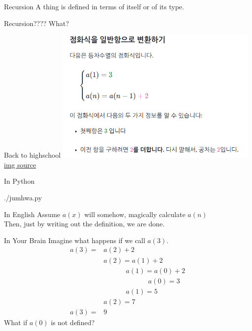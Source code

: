 \documentclass{beamer}
\begin{document}
\begin{frame}{Recursion}
  A thing is defined in terms of itself or of its type.
\end{frame}

\begin{frame}{Recursion????}
  What?
\end{frame}

\begin{frame}{Back to highschool}
  \includegraphics[width=100mm]{./jumhwasik.png}\\
  \href{https://ko.khanacademy.org/math/algebra/sequences/constructing-arithmetic-sequences/a/converting-recursive-and-explicit-formulas-of-arithmetic-sequences}{img
  source}
  
\end{frame}

\begin{frame}[fragile]{In Python}
  \begin{lstinputlisting}
    {./jumhwa.py}
  \end{lstinputlisting}
\end{frame}

\begin{frame}{In English}
  Assume $a(x)$ will somehow, magically calculate $a(n)$\\
  Then, just by writing out the definition, we are done.
\end{frame}

\begin{frame}{In Your Brain}
  Imagine what happens if we call $a(3)$.
  \begin{align*}
a(3) = &a(2) + 2\\
&a(2) = a(1) + 2\\
    &\phantom{{ab}={ab}} a(1) = a(0) + 2\\
    &\phantom{{ab}={ab}{ab}={ab}} a(0) = 3\\
    &\phantom{{ab}={ab}} a(1) = 5\\
    &a(2) = 7\\
a(3) = &9
  \end{align*}
  What if $a(0)$ is not defined?\\
\end{frame}
\end{document}
